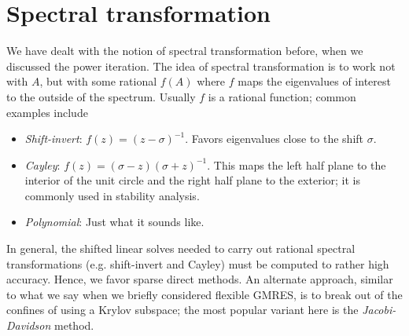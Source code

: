 \section{Spectral transformation}

We have dealt with the notion of spectral transformation before,
when we discussed the power iteration.  The idea of spectral
transformation is to work not with $A$, but with some rational
$f(A)$ where $f$ maps the eigenvalues of interest to the outside
of the spectrum.  Usually $f$ is a rational function; common
examples include
\begin{itemize}
\item {\em Shift-invert}: $f(z) = (z-\sigma)^{-1}$.  Favors
  eigenvalues close to the shift $\sigma$.
\item {\em Cayley}: $f(z) = (\sigma-z) (\sigma +z)^{-1}$.  This maps
  the left half plane to the interior of the unit circle and the
  right half plane to the exterior; it is commonly used in stability
  analysis.
\item {\em Polynomial}: Just what it sounds like.
\end{itemize}
In general, the shifted linear solves needed to carry out rational spectral
transformations (e.g. shift-invert and Cayley) must be computed to
rather high accuracy.  Hence, we favor sparse direct methods.  An alternate
approach, similar to what we say when we briefly considered flexible GMRES,
is to break out of the confines of using a Krylov subspace; the most
popular variant here is the {\em Jacobi-Davidson} method.
